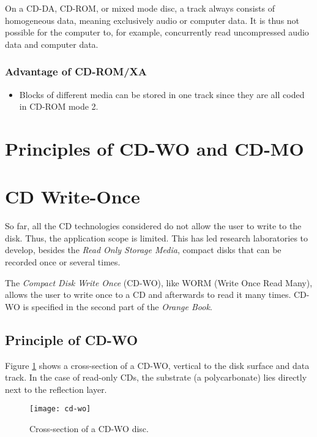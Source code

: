 \noindent On a CD-DA, CD-ROM, or mixed mode disc, a track always consists of homogeneous data, meaning exclusively audio or computer data. It is thus not possible for the
computer to, for example, concurrently read uncompressed audio data and computer data. 


\subsubsection*{Advantage of CD-ROM/XA}
\begin{itemize}
	\item Blocks of different media can be stored in one track since they are all coded in CD-ROM mode 2.
\end{itemize}

\section{Principles of CD-WO and CD-MO}
\section*{CD Write-Once}
So far, all the CD technologies considered do not allow the user to write to the disk. Thus, the application scope is limited. This has led research laboratories
to develop, besides the \textit{Read Only Storage Media}, compact disks that can be recorded once or several times.

The \textit{Compact Disk Write Once} (CD-WO), like WORM (Write Once Read Many), allows the user to write once to a CD and afterwards to read it many times. CD-WO is specified in the second part of the \textit{Orange Book}.

\subsection{Principle of CD-WO}
Figure {\ref{fig:cd-wo}} shows a cross-section of a CD-WO, vertical to the disk surface and data track. In the case of read-only CDs, the substrate (a polycarbonate) lies directly next to the reflection layer.

\begin{figure}[h]
	\centering
	\texttt{[image: cd-wo]}
	\caption{Cross-section of a CD-WO disc.}\label{fig:cd-wo}
\end{figure}

